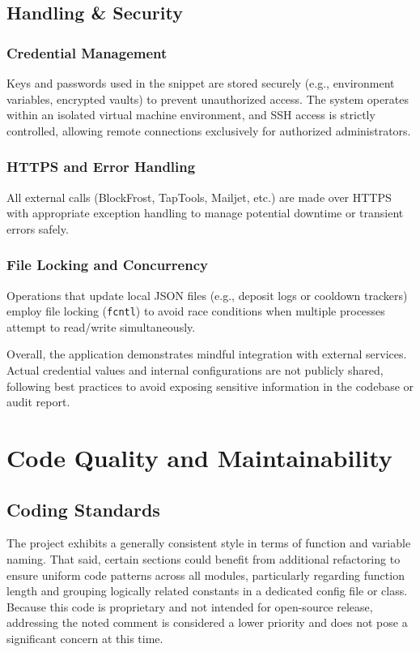 \documentclass[11pt,a4paper]{article}
\begin{document}
\subsection{Handling \& Security}

\subsubsection{Credential Management}
Keys and passwords used in the snippet are stored securely (e.g., environment variables, encrypted vaults) to prevent unauthorized access. The system operates within an isolated virtual machine environment, and SSH access is strictly controlled, allowing remote connections exclusively for authorized administrators.

\subsubsection{HTTPS and Error Handling}
All external calls (BlockFrost, TapTools, Mailjet, etc.) are made over HTTPS with appropriate exception handling to manage potential downtime or transient errors safely.

\subsubsection{File Locking and Concurrency}
Operations that update local JSON files (e.g., deposit logs or cooldown trackers) employ file locking (\texttt{fcntl}) to avoid race conditions when multiple processes attempt to read/write simultaneously.

Overall, the application demonstrates mindful integration with external services. Actual credential values and internal configurations are not publicly shared, following best practices to avoid exposing sensitive information in the codebase or audit report.

\section{Code Quality and Maintainability}

\subsection{Coding Standards}
The project exhibits a generally consistent style in terms of function and variable naming. That said, certain sections could benefit from additional refactoring to ensure uniform code patterns across all modules, particularly regarding function length and grouping logically related constants in a dedicated config file or class. Because this code is proprietary and not intended for open-source release, addressing the noted comment is considered a lower priority and does not pose a significant concern at this time.
\end{document}

